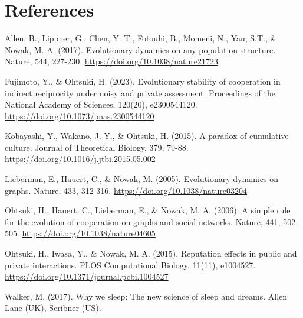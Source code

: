 \documentclass[11pt]{article}
\begin{document}
\section{References}
\begin{hangparas}{0.5in}{1}

Allen, B., Lippner, G., Chen, Y. T., Fotouhi, B., Momeni, N., Yau, S.T., \& Nowak, M. A. (2017). Evolutionary dynamics on any population structure. Nature, 544, 227-230. \url{https://doi.org/10.1038/nature21723}

Fujimoto, Y., \& Ohtsuki, H. (2023). Evolutionary stability of cooperation in indirect reciprocity under noisy and private assessment. Proceedings of the National Academy of Sciences, 120(20), e2300544120. \url{https://doi.org/10.1073/pnas.2300544120}

Kobayashi, Y., Wakano, J. Y., \& Ohtsuki, H. (2015). A paradox of cumulative culture. Journal of Theoretical Biology, 379, 79-88. \url{https://doi.org/10.1016/j.jtbi.2015.05.002}

Lieberman, E., Hauert, C., \& Nowak, M. (2005). Evolutionary dynamics on graphs. Nature, 433, 312-316. \url{https://doi.org/10.1038/nature03204}

Ohtsuki, H., Hauert, C., Lieberman, E., \& Nowak, M. A. (2006). A simple rule for the evolution of cooperation on graphs and social networks. Nature, 441, 502-505. \url{https://doi.org/10.1038/nature04605}

Ohtsuki, H., Iwasa, Y., \& Nowak, M. A. (2015). Reputation effects in public and private interactions. PLOS Computational Biology, 11(11), e1004527. \url{https://doi.org/10.1371/journal.pcbi.1004527}

Walker, M. (2017). Why we sleep: The new science of sleep and dreams. Allen Lane (UK), Scribner (US).

\end{hangparas}
\end{document}
